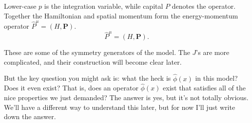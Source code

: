 Lower-case $p$ is the integration variable, while capital $P$ denotes the
operator. Together the Hamiltonian and spatial momentum form the energy-momentum
operator $\hat P^\mu=(H,\mathbf P)$.
\begin{equation}
  \hat P^\mu=(H,\mathbf P).
  \label{eq:253a-free-energy-momentum-generator}
\end{equation}

These are some of the symmetry generators of the model. The $J$'s are more
complicated, and their construction will become clear later.

But the key question you might ask is: what the heck is $\hat{\phi}(x)$ in
this model? Does it even exist?
That is, does an operator $\hat{\phi}(x)$ exist that satisfies all of the
nice properties we just demanded?
The answer is yes, but it's not totally obvious. We'll have a different way to
understand this later, but for now I'll just write down the answer.

